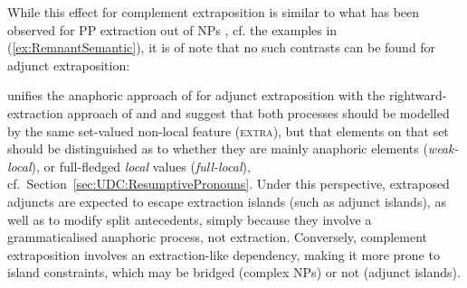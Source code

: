 \documentclass[output=paper
                ,modfonts
                ,nonflat
	        ,collection
	        ,collectionchapter
	        ,collectiontoclongg
 	        ,biblatex
                ,babelshorthands
                ,newtxmath
                ,draftmode
                ,colorlinks, citecolor=brown
]{./langsci/langscibook}
\begin{document}
{\begin{exe}
\ex \label{ex:RemnantSemantic}
\begin{xlist}
\end{xlist}
\end{exe}

While this effect for complement extraposition is similar to what has
been observed for PP extraction out of NPs \citep{DeKuthy02}, cf. the
examples in (\ref{ex:RemnantSemantic}), it is of
note that no such contrasts can be found for adjunct extraposition:

\begin{exe}
\ex
\begin{xlist}
\end{xlist}
\end{exe}


\citet{crysmann_b09xtra} unifies the anaphoric approach of
\citet{kiss_t02nllt} for adjunct extraposition with the
rightward-extraction approach of \citet{Keller:95} and
\cite{Mueller99a} and suggest that both processes should be modelled by
the same set-valued non-local feature (\textsc{extra}), but that
elements on that set should be distinguished as to whether they are
mainly anaphoric elements (\textit{weak-local}), or full-fledged
\textit{local} values (\textit{full-local}), cf.\ Section~\ref{sec:UDC:ResumptivePronouns}.  Under this perspective,
extraposed adjuncts are expected to escape extraction islands (such as
adjunct islands), as well as to modify split antecedents, simply
because they involve a grammaticalised anaphoric process, not
extraction. Conversely, complement extraposition involves an
extraction-like dependency, making it more prone to island
constraints, which may be bridged (complex NPs) or not (adjunct
islands). 


}
\end{document}
